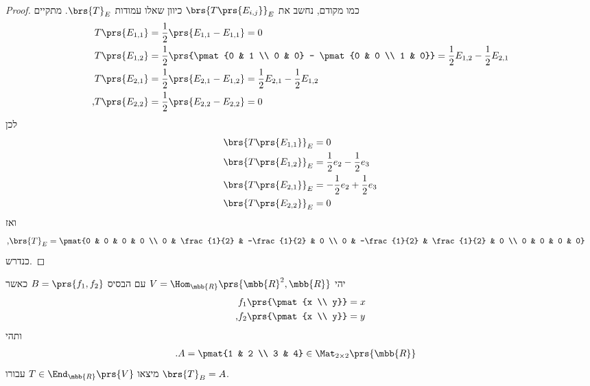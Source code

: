 \documentclass[a4paper,10pt,twoside,openany]{book}
\begin{document}
\begin{proof}
כמו מקודם, נחשב את
$\brs{T\prs{E_{i,j}}}_E$
כיוון שאלו עמודות
$\brs{T}_E$.
מתקיים
\begin{align*}
T\prs{E_{1,1}} &= \frac{1}{2} \prs{E_{1,1} - E_{1,1}} = 0 \\
T\prs{E_{1,2}} &= \frac{1}{2} \prs{\pmat{0 & 1 \\ 0 & 0} - \pmat{0 & 0 \\ 1 & 0}} = \frac{1}{2} E_{1,2} - \frac{1}{2} E_{2,1} \\
T\prs{E_{2,1}} &= \frac{1}{2} \prs{E_{2,1} - E_{1,2}} = \frac{1}{2} E_{2,1} - \frac{1}{2} E_{1,2} \\
\text{,} T\prs{E_{2,2}} &= \frac{1}{2} \prs{E_{2,2} - E_{2,2}} = 0 \\
\end{align*}
לכן
\begin{align*}
\brs{T\prs{E_{1,1}}}_E &= 0 \\
\brs{T\prs{E_{1,2}}}_E &= \frac{1}{2} e_2 - \frac{1}{2} e_3 \\
\brs{T\prs{E_{2,1}}}_E &= -\frac{1}{2} e_2 + \frac{1}{2} e_3 \\
\brs{T\prs{E_{2,2}}}_E &= 0
\end{align*}
ואז
\begin{align*}
\text{,} \brs{T}_E &= \pmat{0 & 0 & 0 & 0 \\ 0 & \frac{1}{2} & -\frac{1}{2} & 0 \\ 0 & -\frac{1}{2} & \frac{1}{2} & 0 \\ 0 & 0 & 0 & 0}
\end{align*}
כנדרש.
\end{proof}

\begin{exercisechap}
יהי
$V = \Hom_{\mbb{R}}\prs{\mbb{R}^2, \mbb{R}}$
עם הבסיס
$B = \prs{f_1, f_2}$
כאשר
\begin{align*}
f_1\prs{\pmat{x \\ y}} &= x \\
\text{,} f_2\prs{\pmat{x \\ y}} &= y
\end{align*}
ותהי
\begin{align*}
\text{.} A &= \pmat{1 & 2 \\ 3 & 4} \in \Mat_{2 \times 2}\prs{\mbb{R}}
\end{align*}
מיצאו
$T \in \End_{\mbb{R}}\prs{V}$
עבורו
$\brs{T}_B = A$.
\end{exercisechap}
\end{document}
